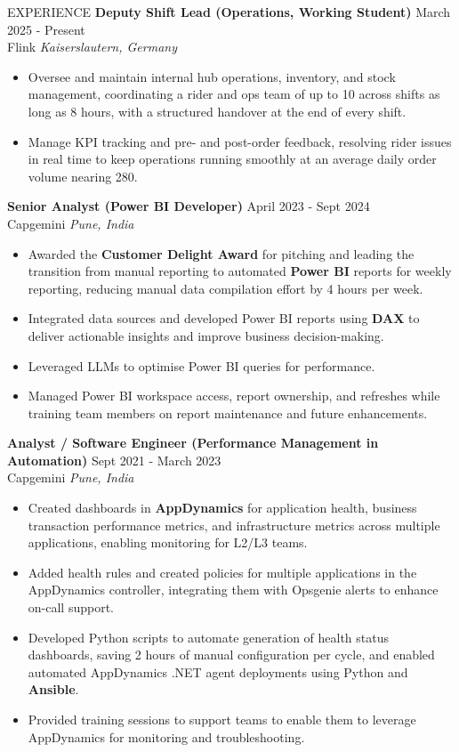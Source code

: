 \documentclass{resume}
\begin{document}
\begin{rSection}{EXPERIENCE}
\textbf{Deputy Shift Lead (Operations, Working Student)} \hfill March 2025 - Present\\
Flink \hfill \textit{Kaiserslautern, Germany}
 \begin{itemize}
    \itemsep -1pt {}
     \item Oversee and maintain internal hub operations, inventory, and stock management, coordinating a rider and ops team of up to 10 across shifts as long as 8 hours, with a structured handover at the end of every shift.
     \item Manage KPI tracking and pre- and post-order feedback, resolving rider issues in real time to keep operations running smoothly at an average daily order volume nearing 280.
 \end{itemize}
\textbf{Senior Analyst (Power BI Developer)} \hfill April 2023 - Sept 2024\\
Capgemini \hfill \textit{Pune, India}
 \begin{itemize}
    \itemsep -1pt {}
     \item Awarded the \textbf{Customer Delight Award} for pitching and leading the transition from manual reporting to automated \textbf{Power BI} reports for weekly reporting, reducing manual data compilation effort by 4 hours per week.
     \item Integrated data sources and developed Power BI reports using \textbf{DAX} to deliver actionable insights and improve business decision-making.
     \item Leveraged LLMs to optimise Power BI queries for performance.
     \item Managed Power BI workspace access, report ownership, and refreshes while training team members on report maintenance and future enhancements.
 \end{itemize}
\newpage
\textbf{Analyst / Software Engineer (Performance Management in Automation)} \hfill {Sept 2021 - March 2023}\\
Capgemini \hfill \textit{Pune, India}
 \begin{itemize}
    \itemsep -1pt {}
     \item Created dashboards in \textbf{AppDynamics} for application health, business transaction performance metrics, and infrastructure metrics across multiple applications, enabling monitoring for L2/L3 teams.
     \item Added health rules and created policies for multiple applications in the AppDynamics controller, integrating them with Opsgenie alerts to enhance on-call support.
     \item Developed Python scripts to automate generation of health status dashboards, saving 2 hours of manual configuration per cycle, and enabled automated AppDynamics .NET agent deployments using Python and \textbf{Ansible}.
     \item Provided training sessions to support teams to enable them to leverage AppDynamics for monitoring and troubleshooting.
 \end{itemize}
\end{rSection}
\end{document}
